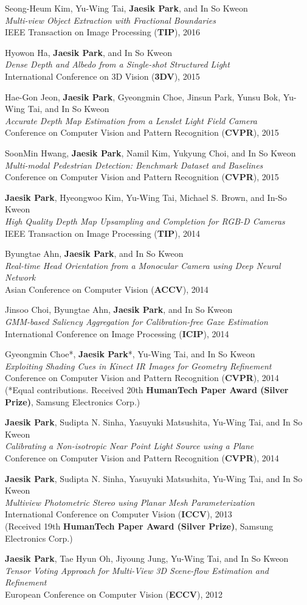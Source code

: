 \documentclass[letterpaper,11pt]{article}
\newcommand{\publicationItem}[4]{
  \small{
  \item{#1\\ \emph{#2}\\ #3\\ #4}
  }
}
\begin{document}
    \publicationItem{Seong-Heum Kim, Yu-Wing Tai, \textbf{Jaesik Park}, and In So Kweon}{Multi-view Object Extraction with Fractional Boundaries}{IEEE Transaction on Image Processing (\textbf{TIP}), 2016}{}
    \publicationItem{Hyowon Ha, \textbf{Jaesik Park}, and In So Kweon}{Dense Depth and Albedo from a Single-shot Structured Light}{International Conference on 3D Vision (\textbf{3DV}), 2015}{}
    \publicationItem{Hae-Gon Jeon, \textbf{Jaesik Park}, Gyeongmin Choe, Jinsun Park, Yunsu Bok, Yu-Wing Tai, and In So Kweon}{Accurate Depth Map Estimation from a Lenslet Light Field Camera}{Conference on Computer Vision and Pattern Recognition (\textbf{CVPR}), 2015}{}
    \publicationItem{SoonMin Hwang, \textbf{Jaesik Park}, Namil Kim, Yukyung Choi, and In So Kweon}{Multi-modal Pedestrian Detection: Benchmark Dataset and Baselines}{Conference on Computer Vision and Pattern Recognition (\textbf{CVPR}), 2015}{}
    \publicationItem{\textbf{Jaesik Park}, Hyeongwoo Kim, Yu-Wing Tai, Michael S. Brown, and In-So Kweon}{High Quality Depth Map Upsampling and Completion for RGB-D Cameras}{IEEE Transaction on Image Processing (\textbf{TIP}), 2014}{}
    \publicationItem{Byungtae Ahn, \textbf{Jaesik Park}, and In So Kweon}{Real-time Head Orientation from a Monocular Camera using Deep Neural Network}{Asian Conference on Computer Vision (\textbf{ACCV}), 2014}{}
    \publicationItem{Jinsoo Choi, Byungtae Ahn, \textbf{Jaesik Park}, and In So Kweon}{GMM-based Saliency Aggregation for Calibration-free Gaze Estimation}{International Conference on Image Processing (\textbf{ICIP}), 2014}{}
    \publicationItem{Gyeongmin Choe*, \textbf{Jaesik Park}*, Yu-Wing Tai, and In So Kweon}{Exploiting Shading Cues in Kinect IR Images for Geometry Refinement}{Conference on Computer Vision and Pattern Recognition (\textbf{CVPR}), 2014}{(*Equal contributions. Received 20th \textbf{HumanTech Paper Award (Silver Prize)}, Samsung Electronics Corp.)}
    \publicationItem{\textbf{Jaesik Park}, Sudipta N. Sinha, Yasuyuki Matsushita, Yu-Wing Tai, and In So Kweon}{Calibrating a Non-isotropic Near Point Light Source using a Plane}{Conference on Computer Vision and Pattern Recognition (\textbf{CVPR}), 2014}{}
    \publicationItem{\textbf{Jaesik Park}, Sudipta N. Sinha, Yasuyuki Matsushita, Yu-Wing Tai, and In So Kweon}{Multiview Photometric Stereo using Planar Mesh Parameterization}{International Conference on Computer Vision (\textbf{ICCV}), 2013}{(Received 19th \textbf{HumanTech Paper Award (Silver Prize)}, Samsung Electronics Corp.)}
    \publicationItem{\textbf{Jaesik Park}, Tae Hyun Oh, Jiyoung Jung, Yu-Wing Tai, and In So Kweon}{Tensor Voting Approach for Multi-View 3D Scene-flow Estimation and Refinement}{European Conference on Computer Vision (\textbf{ECCV}), 2012}{}
\end{document}
